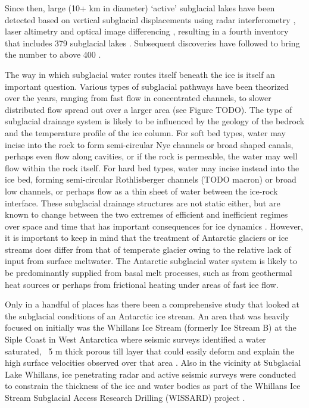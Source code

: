 Since then, large (10+ km in diameter) `active' subglacial lakes have been detected based on vertical subglacial displacements using radar interferometry \citep{GrayEvidencesubglacialwater2005}, laser altimetry \citep{Smithinventoryactivesubglacial2009} and optical image differencing \citep{FrickerActiveSubglacialWater2007}, resulting in a fourth inventory that includes 379 subglacial lakes \citep{WrightfourthinventoryAntarctic2012}.
Subsequent discoveries have followed to bring the number to above 400 \citep[e.g.][]{WrightEvidencehydrologicalconnection2012,WrightSubglacialhydrologicalconnectivity2014,KimActivesubglaciallakes2016,RiveraSubglacialLakeCECs2015,SmithConnectedsubglaciallake2017}.

The way in which subglacial water routes itself beneath the ice is itself an important question.
Various types of subglacial pathways have been theorized over the years, ranging from fast flow in concentrated channels, to slower distributed flow spread out over a larger area (see Figure TODO).
The type of subglacial drainage system is likely to be influenced by the geology of the bedrock and the temperature profile of the ice column.
For soft bed types, water may incise into the rock to form semi-circular Nye channels or broad shaped canals, perhaps even flow along cavities, or if the rock is permeable, the water may well flow within the rock itself.
For hard bed types, water may incise instead into the ice bed, forming semi-circular Rothlisberger channels (TODO macron) or broad low channels, or perhaps flow as a thin sheet of water between the ice-rock interface.
These subglacial drainage structures are not static either, but are known to change between the two extremes of efficient and inefficient regimes over space and time that has important consequences for ice dynamics \citep{MullerVelocityfluctuationswater1973}.
However, it is important to keep in mind that the treatment of Antarctic glaciers or ice streams does differ from that of temperate glacier owing to the relative lack of input from surface meltwater.
The Antarctic subglacial water system is likely to be predominantly supplied from basal melt processes, such as from geothermal heat sources or perhaps from frictional heating under areas of fast ice flow.

Only in a handful of places has there been a comprehensive study that looked at the subglacial conditions of an Antarctic ice stream.
An area that was heavily focused on initially was the Whillans Ice Stream (formerly Ice Stream B) at the Siple Coast in West Antarctica where seismic surveys identified a water saturated, ~5 m thick porous till layer \citep{BlankenshipSeismicmeasurementsreveal1986} that could easily deform and explain the high surface velocities observed over that area \citep{AlleyDeformationtillice1986}.
Also in the vicinity at Subglacial Lake Whillans, ice penetrating radar \citep{ChristiansonSubglacialLakeWhillans2012} and active seismic \citep{HorganSubglacialLakeWhillans2012} surveys were conducted to constrain the thickness of the ice and water bodies as part of the Whillans Ice Stream Subglacial Access Research Drilling (WISSARD) project \citep{TulaczykWISSARDSubglacialLake2014}.

